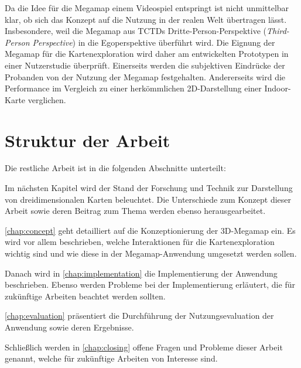 

Da die Idee für die Megamap einem Videospiel entspringt ist nicht unmittelbar klar, ob sich das Konzept auf die Nutzung in der realen Welt übertragen lässt.
Insbesondere, weil die Megamap aus TCTDs Dritte-Person-Perspektive (\emph{Third-Person Perspective}) in die Egoperspektive überführt wird.
Die Eignung der Megamap für die Kartenexploration wird daher am entwickelten Prototypen in einer Nutzerstudie überprüft.
Einerseits werden die subjektiven Eindrücke der Probanden von der Nutzung der Megamap festgehalten.
Andererseits wird die Performance im Vergleich zu einer herkömmlichen 2D-Darstellung einer Indoor-Karte verglichen.

\section{Struktur der Arbeit}
\label{sec:struktur}
Die restliche Arbeit ist in die folgenden Abschnitte unterteilt:

Im nächsten Kapitel wird der Stand der Forschung und Technik zur Darstellung von dreidimensionalen Karten beleuchtet.
Die Unterschiede zum Konzept dieser Arbeit sowie deren Beitrag zum Thema werden ebenso herausgearbeitet.

\autoref{chap:concept} geht detailliert auf die Konzeptionierung der 3D-Megamap ein.
Es wird vor allem beschrieben, welche Interaktionen für die Kartenexploration wichtig sind und wie diese in der Megamap-Anwendung umgesetzt werden sollen.

Danach wird in \autoref{chap:implementation} die Implementierung der Anwendung beschrieben.
Ebenso werden Probleme bei der Implementierung erläutert, die für zukünftige Arbeiten beachtet werden sollten.

\autoref{chap:evaluation} präsentiert die Durchführung der Nutzungsevaluation der Anwendung sowie deren Ergebnisse.

Schließlich werden in \autoref{chap:closing} offene Fragen und Probleme dieser Arbeit genannt, welche für zukünftige Arbeiten von Interesse sind.
%
\cleardoublepage
